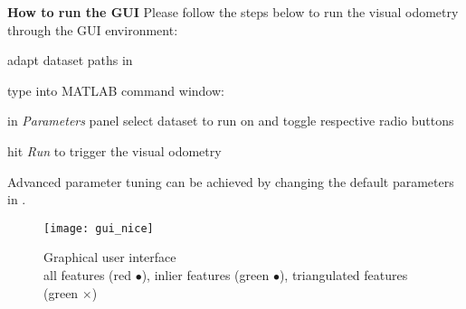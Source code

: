 \textbf{How to run the GUI}
Please follow the steps below to run the visual odometry through the GUI environment:
\begin{compactenum}
	\item adapt dataset paths in 
	\item type into MATLAB command window: 
	\item in \textit{Parameters} panel select dataset to run on and toggle respective radio buttons
	\item hit \textit{Run} to trigger the visual odometry\\
\end{compactenum}

Advanced parameter tuning can be achieved by changing the default parameters in .

\begin{figure}[ht]
	\centering
	\texttt{[image: gui\_nice]}
	\captionsetup{justification=centering}
	\caption{Graphical user interface \\all features (red $\bullet$), inlier features (green $\bullet$), triangulated features (green $\times$)}
	\label{img_gui}
\end{figure}


\clearpage{\pagestyle{plain}\cleardoublepage}

\clearpage{\pagestyle{plain}\cleardoublepage}